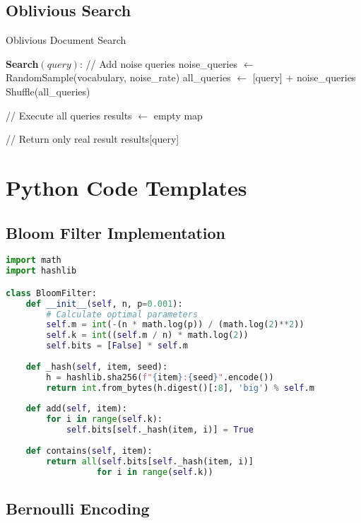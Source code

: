 \subsection{Oblivious Search}

\begin{algorithm}[H]
\caption{Oblivious Document Search}
\SetAlgoLined
\textbf{Search}$(query)$:\;
\Indp
    // Add noise queries\;
    noise\_queries $\gets$ RandomSample(vocabulary, noise\_rate)\;
    all\_queries $\gets$ [query] + noise\_queries\;
    Shuffle(all\_queries)\;
    
    // Execute all queries\;
    results $\gets$ empty map\;
    
    // Return only real result\;
    \Return results[query]\;
\Indm
\end{algorithm}

\section{Python Code Templates}

\subsection{Bloom Filter Implementation}

\begin{lstlisting}[language=Python]
import math
import hashlib

class BloomFilter:
    def __init__(self, n, p=0.001):
        # Calculate optimal parameters
        self.m = int(-(n * math.log(p)) / (math.log(2)**2))
        self.k = int((self.m / n) * math.log(2))
        self.bits = [False] * self.m
        
    def _hash(self, item, seed):
        h = hashlib.sha256(f"{item}:{seed}".encode())
        return int.from_bytes(h.digest()[:8], 'big') % self.m
    
    def add(self, item):
        for i in range(self.k):
            self.bits[self._hash(item, i)] = True
    
    def contains(self, item):
        return all(self.bits[self._hash(item, i)] 
                  for i in range(self.k))
\end{lstlisting}

\subsection{Bernoulli Encoding}

